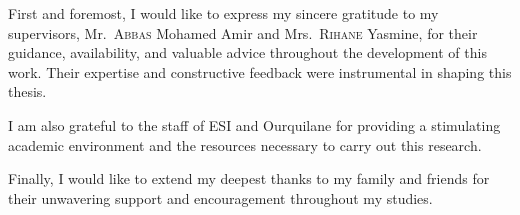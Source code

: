 
First and foremost, I would like to express my sincere gratitude to my supervisors,
Mr.\ \textsc{Abbas} Mohamed Amir and Mrs.\ \textsc{Rihane} Yasmine, for their guidance,
availability, and valuable advice throughout the development of this work. Their expertise
and constructive feedback were instrumental in shaping this thesis.

I am also grateful to the staff of ESI and Ourquilane for providing a stimulating academic environment and the resources necessary to carry
out this research.

Finally, I would like to extend my deepest thanks to my family and friends for their
unwavering support and encouragement throughout my studies.